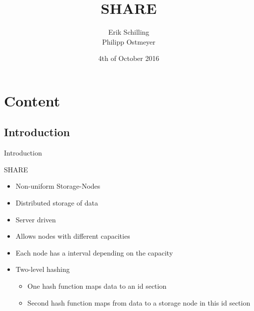 \documentclass{beamer}
\title[SHARE]{SHARE}
\author{Erik Schilling\\Philipp	Ostmeyer}
\institute{Universität Paderborn}
\date{4th of October 2016}
\begin{document}
	\section{}
	\begin{frame}
		\titlepage
	\end{frame}

	\section{Content}
	\subsection{Introduction}
	\begin{frame}{Introduction}
		\begin{block}{SHARE}
			\begin{itemize}
				\item Non-uniform Storage-Nodes
				\item Distributed storage of data
				\item Server driven
			\end{itemize}
		\end{block}

		\begin{itemize}
			\item Allows nodes with different capacities
			\item Each node has a interval depending on the capacity
			\item Two-level hashing
			\begin{itemize}
				\item One hash function maps data to an id section
				\item Second hash function maps from data to a storage node in this id section
			\end{itemize}
		\end{itemize}
	\end{frame}
\end{document}
